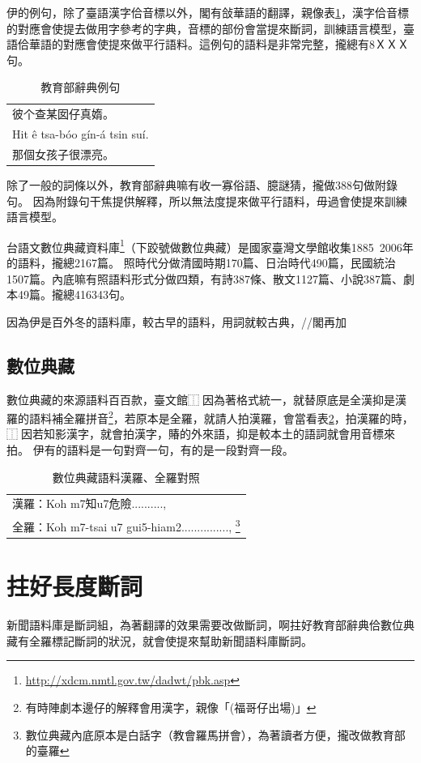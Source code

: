 \documentclass[final,oneside,onecolumn,12pt,a4paper]{book}%
\begin{document}
伊的例句，除了臺語漢字佮音標以外，閣有敆華語的翻譯，親像表\ref{表：教育部辭典例句}，漢字佮音標的對應會使提去做用字參考的字典，音標的部份會當提來斷詞，訓練語言模型，臺語佮華語的對應會使提來做平行語料。這例句的語料是非常完整，攏總有8ＸＸＸ句。
\begin{table}
\caption{教育部辭典例句}
\label{表：教育部辭典例句}
\centering
\begin{tabular}{l}
彼个查某囡仔真媠。 \\
Hit ê tsa-bóo gín-á tsin suí.\\
那個女孩子很漂亮。\\
\end{tabular}
\end{table}

除了一般的詞條以外，教育部辭典嘛有收一寡俗語、臆謎猜，攏做388句做附錄句。
因為附錄句干焦提供解釋，所以無法度提來做平行語料，毋過會使提來訓練語言模型。

台語文數位典藏資料庫\footnote{\url{http://xdcm.nmtl.gov.tw/dadwt/pbk.asp}}（下跤號做數位典藏）是國家臺灣文學館收集1885~2006年的語料，攏總2167篇。
照時代分做清國時期170篇、日治時代490篇，民國統治1507篇。內底嘛有照語料形式分做四類，有詩387條、散文1127篇、小說387篇、劇本49篇。攏總416343句。

因為伊是百外冬的語料庫，較古早的語料，用詞就較古典，//閣再加

\subsection{數位典藏}
\label{節：數位典藏}
數位典藏的來源語料百百款，臺文館⿰因為著格式統一，就替原底是全漢抑是漢羅的語料補全羅拼音\footnote{有時陣劇本邊仔的解釋會用漢字，親像「(福哥仔出場)」}，若原本是全羅，就請人拍漢羅，會當看表\ref{表：數位典藏語料}，拍漢羅的時，⿰因若知影漢字，就會拍漢字，賰的外來語，抑是較本土的語詞就會用音標來拍。
伊有的語料是一句對齊一句，有的是一段對齊一段。

\begin{table}
\caption{數位典藏語料漢羅、全羅對照}
\label{表：數位典藏語料}
\centering
\begin{tabular}{l}
漢羅：Koh m7知u7危險.........., \\
全羅：Koh m7-tsai u7 gui5-hiam2..............., \footnote{數位典藏內底原本是白話字（教會羅馬拼會），為著讀者方便，攏改做教育部的臺羅}\\
\end{tabular}
\end{table}

\section{拄好長度斷詞}
\label{節：拄好長度斷詞}
新聞語料庫是斷詞組，為著翻譯的效果需要改做斷詞，啊拄好教育部辭典佮數位典藏有全羅標記斷詞的狀況，就會使提來幫助新聞語料庫斷詞。
\end{document}

